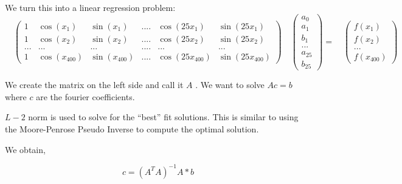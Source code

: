 \documentclass[11pt]{article}
\begin{document}
We turn this into a linear regression problem: \[
\quad
\begin{pmatrix} 
1 & \cos(x_1) & \sin(x_1) & .... & \cos(25x_1) & \sin(25x_1)\\
1 & \cos(x_2) & \sin(x_2) & .... & \cos(25x_2) & \sin(25x_2)\\
... & ... & ... & .... & ... & ... \\
1 & \cos(x_{400}) & \sin(x_{400}) & .... & \cos(25x_{400}) & \sin(25x_{400})
\end{pmatrix}
\quad
\begin{pmatrix} 
a_0\\
a_1\\
b_1\\
...\\
a_{25}\\
b_{25}
\end{pmatrix}
=
\quad
\begin{pmatrix} 
f(x_1)\\
f(x_2)\\
...\\
f(x_{400})
\end{pmatrix}
\]

We create the matrix on the left side and call it \(A\) . We want to
solve \(Ac=b\) where \(c\) are the fourier coefficients.

\(L-2\) norm is used to solve for the ``best'' fit solutions. This is
similar to using the Moore-Penrose Pseudo Inverse to compute the optimal
solution.

We obtain,

\[ c=(A^{T}A)^{-1}A*b \]
\end{document}
